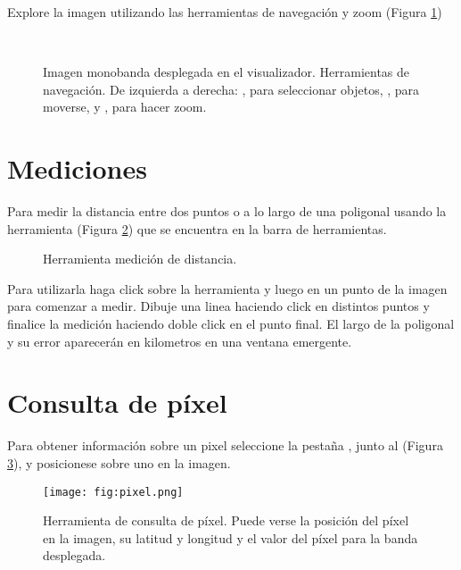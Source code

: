 Explore la imagen utilizando las herramientas de navegación y zoom (Figura \ref{fig:mono})

\begin{figure}[h!]
    \centering
    \\
    \caption{Imagen monobanda desplegada en el visualizador. Herramientas de navegación. De izquierda a derecha: , para seleccionar objetos, , para moverse, y , para hacer zoom.}
    \label{fig:mono}
\end{figure}

\section{Mediciones}

Para medir la distancia entre dos puntos o a lo largo de una poligonal usando la herramienta  (Figura \ref{fig:distancia}) que se encuentra en la barra de herramientas.

\begin{figure}[h!]
    \centering
    \caption{Herramienta medición de distancia.}
    \label{fig:distancia}
\end{figure}

Para utilizarla haga click sobre la herramienta y luego en un punto de la imagen para comenzar a medir. Dibuje una linea haciendo click en distintos puntos y finalice la medición haciendo doble click en el punto final. El largo de la poligonal y su error aparecerán en kilometros en una ventana emergente.

\section{Consulta de píxel}

Para obtener información sobre un pixel seleccione la pestaña , junto al  (Figura \ref{fig:pixel}), y posicionese  sobre uno en la imagen.

\begin{figure}[h!]
    \centering
    \texttt{[image: fig:pixel.png]}
    \caption{Herramienta de consulta de píxel. Puede verse la posición del píxel en la imagen, su latitud y longitud y el valor del píxel para la banda desplegada.}
    \label{fig:pixel}
\end{figure}

